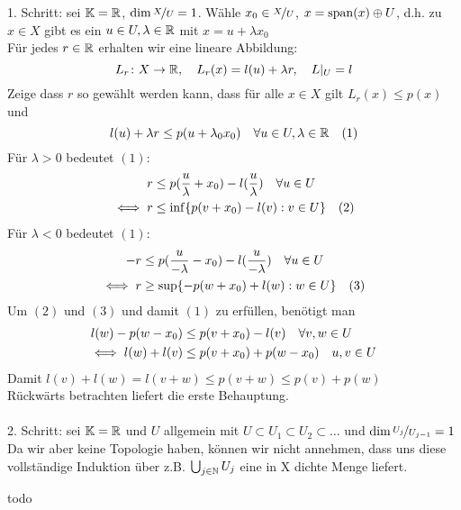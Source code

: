 \begin{beweis}
	1. Schritt: sei $\mathbb{K} = \mathbb{R}$, $\dim \nicefrac{X}{U} = 1$. Wähle $x_{0} \in \nicefrac{X}{U}$, $x = \operatorname{span}(x) \oplus U$, d.h. zu $x \in X$ gibt es ein $u \in U, \lambda \in \mathbb{R}$ mit $x = u + \lambda x_{0}$ \\
	Für jedes $r \in \mathbb{R}$ erhalten wir eine lineare Abbildung:
	\[ L_{r} \colon X \rightarrow \mathbb{R}, \quad L_{r} (x) = l(u) + \lambda r, \quad L|_{U} = l \]
	Zeige dass $r$ so gewählt werden kann, dass für alle $x \in X$ gilt $L_{r}(x) \leq p(x)$ und 
	\[ l(u) + \lambda r \leq p(u + \lambda_{0} x_{0}) \quad \forall u \in U, \lambda \in \mathbb{R} \quad (1) \label{eq:20.2.5-1} \]
	Für $\lambda > 0$ bedeutet \hyperref[eq:20.2.5-1]{$(1)$}:
	\begin{align*}
		r & \leq p(\frac{u}{\lambda} + x_{0}) - l(\frac{u}{\lambda}) \quad \forall u \in U \\
		\iff r & \leq \inf \{ p( v + x_{0}) - l(v) : v \in U \} \quad (2) \label{eq:20.2.5-2}
	\end{align*}
	Für $\lambda < 0$ bedeutet \hyperref[eq:20.2.5-1]{$(1)$}:
	\begin{align*}
		- r & \leq p(\frac{u}{- \lambda} - x_{0}) - l(\frac{u}{- \lambda}) \quad \forall u \in U \\
		\iff r & \geq \sup \{ - p( w + x_{0}) + l(w) : w \in U \} \quad (3) \label{eq:20.2.5-3}
	\end{align*}
	Um \hyperref[eq:20.2.5-2]{$(2)$} und \hyperref[eq:20.2.5-3]{$(3)$} und damit \hyperref[eq:20.2.5-1]{$(1)$} zu erfüllen, benötigt man
	\begin{align*}
		l(w) - p(w - x_{0}) & \leq p(v + x_{0}) - l(v) \quad \forall v, w \in U \\
		\iff l(w) + l(v) & \leq p(v + x_{0}) + p(w - x_{0}) \quad u, v \in U
	\end{align*}
	Damit $l(v) + l(w) = l(v + w) \leq p(v + w) \leq p(v) + p(w)$ \\
	Rückwärts betrachten liefert die erste Behauptung. \\ \\
	2. Schritt: sei $\mathbb{K} = \mathbb{R}$ und $U$ allgemein mit $U \subset U_{1} \subset U_{2} \subset \dotsc$ und $\dim \nicefrac{U_{j}}{U_{j - 1}} = 1$ \\
	Da wir aber keine Topologie haben, können wir nicht annehmen, dass uns diese vollständige Induktion über z.B. $\bigcup_{j \in \mathbb{N}} U_{j}$ eine in X dichte Menge liefert.
	
	todo %
\end{beweis}



